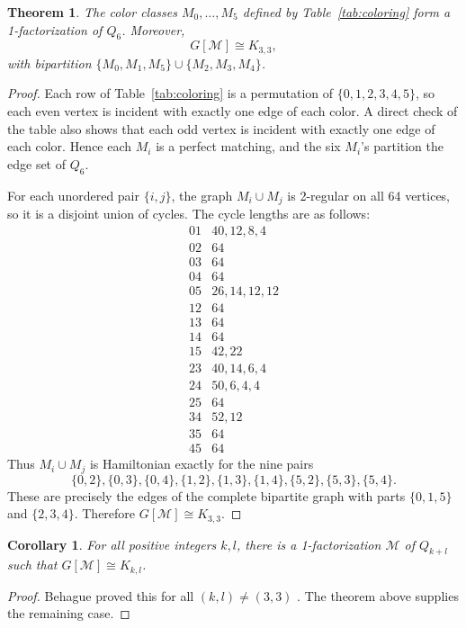 \documentclass[preprint,12pt]{elsarticle}
\newtheorem{theorem}{Theorem}
\newtheorem{corollary}{Corollary}
\newcommand{\M}{\mathcal M}
\begin{document}
\begin{theorem}
The color classes \(M_0,\dots,M_5\) defined by Table~\ref{tab:coloring} form
a 1-factorization of \(Q_6\). Moreover,
\[
  G[\M]\cong K_{3,3},
\]
with bipartition \(\{M_0,M_1,M_5\}\cup\{M_2,M_3,M_4\}\).
\end{theorem}

\begin{proof}
Each row of Table~\ref{tab:coloring} is a permutation of
\(\{0,1,2,3,4,5\}\), so each even vertex is incident with exactly one edge of
each color. A direct check of the table also shows that each odd vertex is
incident with exactly one edge of each color. Hence each \(M_i\) is a perfect
matching, and the six \(M_i\)'s partition the edge set of \(Q_6\).

For each unordered pair \(\{i,j\}\), the graph \(M_i\cup M_j\) is 2-regular
on all 64 vertices, so it is a disjoint union of cycles. The cycle lengths are
as follows:
\[
\begin{array}{c|l}
01 & 40,12,8,4\\
02 & 64\\
03 & 64\\
04 & 64\\
05 & 26,14,12,12\\
12 & 64\\
13 & 64\\
14 & 64\\
15 & 42,22\\
23 & 40,14,6,4\\
24 & 50,6,4,4\\
25 & 64\\
34 & 52,12\\
35 & 64\\
45 & 64
\end{array}
\]
Thus \(M_i\cup M_j\) is Hamiltonian exactly for the nine pairs
\[
  \{0,2\},\{0,3\},\{0,4\},
  \{1,2\},\{1,3\},\{1,4\},
  \{5,2\},\{5,3\},\{5,4\}.
\]
These are precisely the edges of the complete bipartite graph with parts
\(\{0,1,5\}\) and \(\{2,3,4\}\). Therefore \(G[\M]\cong K_{3,3}\).
\end{proof}

\begin{corollary}
For all positive integers \(k,l\), there is a 1-factorization \(\M\) of
\(Q_{k+l}\) such that \(G[\M]\cong K_{k,l}\).
\end{corollary}

\begin{proof}
Behague proved this for all \((k,l)\ne(3,3)\) \cite[Theorem 2]{behague}. The
theorem above supplies the remaining case.
\end{proof}
\end{document}
